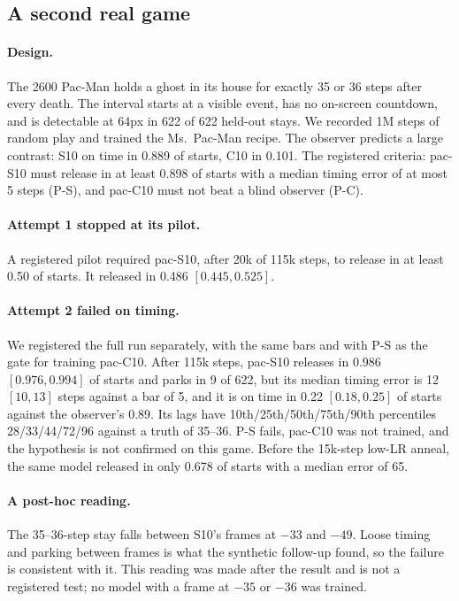 \documentclass[11pt]{article}
\begin{document}
\subsection{A second real game}
\label{sec:realgame}
\paragraph{Design.} The 2600 Pac-Man holds a ghost in its house for exactly 35 or 36 steps after every death. The
interval starts at a visible event, has no on-screen countdown, and is detectable at 64px in 622 of 622 held-out
stays. We recorded 1M steps of random play and trained the Ms.~Pac-Man recipe. The observer predicts a large
contrast: S10 on time in 0.889 of starts, C10 in 0.101. The registered criteria: pac-S10 must release in at least
0.898 of starts with a median timing error of at most 5 steps (P-S), and pac-C10 must not beat a blind observer
(P-C).

\paragraph{Attempt 1 stopped at its pilot.} A registered pilot required pac-S10, after 20k of 115k steps, to release
in at least 0.50 of starts. It released in 0.486 $[0.445, 0.525]$.

\paragraph{Attempt 2 failed on timing.} We registered the full run separately, with the same bars and with P-S as
the gate for training pac-C10. After 115k steps, pac-S10 releases in 0.986 $[0.976, 0.994]$ of starts and parks in 9
of 622, but its median timing error is 12 $[10, 13]$ steps against a bar of 5, and it is on time in 0.22
$[0.18, 0.25]$ of starts against the observer's 0.89. Its lags have 10th/25th/50th/75th/90th percentiles
28/33/44/72/96 against a truth of 35--36. P-S fails, pac-C10 was not trained, and the hypothesis is not confirmed on
this game. Before the 15k-step low-LR anneal, the same model released in only 0.678 of starts with a median error of 65.

\paragraph{A post-hoc reading.} The 35--36-step stay falls between S10's frames at $-33$ and $-49$. Loose timing and
parking between frames is what the synthetic follow-up found, so the failure is consistent with it. This reading was
made after the result and is not a registered test; no model with a frame at $-35$ or $-36$ was trained.
\end{document}
